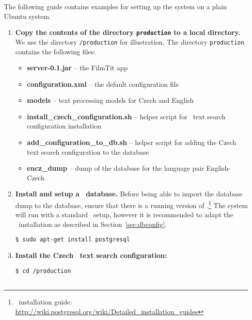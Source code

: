 The following guide contains examples for setting up the system on a plain Ubuntu system.

\begin{enumerate}

\item \textbf{Copy the contents of the directory {\tt production} to a local directory.} We use the directory {\tt /production} for illustration. The directory {\tt production} contains the following files:

\begin{itemize}
	\item \textbf{server-0.1.jar} -- the FilmTit app
	\item \textbf{configuration.xml} -- the default configuration file
	\item \textbf{models} -- text processing models for Czech and English
	\item \textbf{install\_czech\_configuration.sh} -- helper script for \postgres~text search configuration installation
	\item \textbf{add\_configuration\_to\_db.sh} -- helper script for adding the Czech text search configuration to the database
	\item \textbf{encz\_dump} -- dump of the database for the language pair English-Czech
\end{itemize}

\item \textbf{Install and setup a \postgres~database.} Before being able to import the database dump to the database, ensure that there is a running version of \postgres.\footnote{\postgres~installation guide: \url{http://wiki.postgresql.org/wiki/Detailed_installation_guides}} The system will run with a standard \postgres~setup, however it is recommended to adapt the \postgres~installation as described in Section~\ref{sec:dbconfig}.

\vspace*{0.5em}
\begin{lstlisting}
$ sudo apt-get install postgresql
\end{lstlisting}
\vspace*{0.5em}


\item \textbf{Install the Czech \postgres~text search configuration:}
\vspace*{0.5em}
\begin{lstlisting}
$ cd /production


\end{lstlisting}
\end{enumerate}
